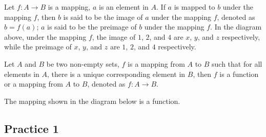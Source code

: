 \documentclass[12pt]{report}
\begin{document}
Let $f:A \to B$ is a mapping, $a$ is an element in $A$. If $a$ is mapped to $b$
under the mapping $f$, then $b$ is said to be the image of $a$ under the
mapping $f$, denoted as $b = f (a)$; $a$ is said to be the preimage of $b$
under the mapping $f$. In the diagram above, under the mapping $f$, the image
of $1$, $2$, and $4$ are $x$, $y$, and $z$ respectively, while the preimage of
$x$, $y$, and $z$ are $1$, $2$, and $4$ respectively.

\begin{mdframed}[style=MyFrame]
      Let $A$ and $B$ be two non-empty sets, $f$ is a mapping from $A$ to $B$ such that for all elements in $A$, there is a unique corresponding element in $B$, then $f$ is a function or a mapping from $A$ to $B$, denoted as $f:A \to B$.
\end{mdframed}

The mapping shown in the diagram below is a function.
\begin{center}
\end{center}

\subsection{Practice 1}
\end{document}
